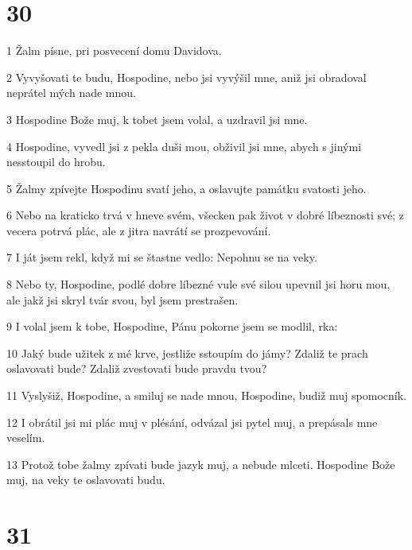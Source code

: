 \chapter{30}

\par 1 Žalm písne, pri posvecení domu Davidova.
\par 2 Vyvyšovati te budu, Hospodine, nebo jsi vyvýšil mne, aniž jsi obradoval neprátel mých nade mnou.
\par 3 Hospodine Bože muj, k tobet jsem volal, a uzdravil jsi mne.
\par 4 Hospodine, vyvedl jsi z pekla duši mou, obživil jsi mne, abych s jinými nesstoupil do hrobu.
\par 5 Žalmy zpívejte Hospodinu svatí jeho, a oslavujte památku svatosti jeho.
\par 6 Nebo na kraticko trvá v hneve svém, všecken pak život v dobré líbeznosti své; z vecera potrvá plác, ale z jitra navrátí se prozpevování.
\par 7 I ját jsem rekl, když mi se štastne vedlo: Nepohnu se na veky.
\par 8 Nebo ty, Hospodine, podlé dobre líbezné vule své silou upevnil jsi horu mou, ale jakž jsi skryl tvár svou, byl jsem prestrašen.
\par 9 I volal jsem k tobe, Hospodine, Pánu pokorne jsem se modlil, rka:
\par 10 Jaký bude užitek z mé krve, jestliže sstoupím do jámy? Zdaliž te prach oslavovati bude? Zdaliž zvestovati bude pravdu tvou?
\par 11 Vyslyšiž, Hospodine, a smiluj se nade mnou, Hospodine, budiž muj spomocník.
\par 12 I obrátil jsi mi plác muj v plésání, odvázal jsi pytel muj, a prepásals mne veselím.
\par 13 Protož tobe žalmy zpívati bude jazyk muj, a nebude mlceti. Hospodine Bože muj, na veky te oslavovati budu.

\chapter{31}

